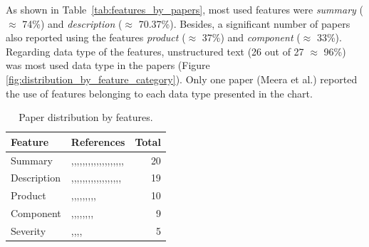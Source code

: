
As shown in Table~\ref{tab:features_by_papers}, most used features were \textit{summary} ($\approx$ 74\%) and \textit{description} ($\approx$ 70.37\%). Besides, a significant number of papers also reported using the features \textit{product} ($\approx$ 37\%) and \textit{component} ($\approx$ 33\%). Regarding data type of the features, unstructured text (26 out of 27 $\approx$ 96\%) was most used data type in the papers  (Figure \ref{fig:distribution_by_feature_category}). Only one paper (Meera et al.\cite{Meera:2014}) reported the use of features belonging to each data type presented in the chart.

\begin{table}[h!]
  \vspace{30pt}
  \centering
  \captionsetup{type=table}
  \caption{Paper distribution by features.}
  \small
  \begin{tabular}{@{}lp{10cm}r@{}} 
    \toprule
    \textbf{Feature} & \textbf{References} & \textbf{Total} \\
    \midrule
    Summary & \cite{Lamkanfi:2010},\cite{Lamkanfi:2011},\cite{Tian:2012},\cite{Yang:2012},\cite{Chaturvedi:2012},\cite{Yang:2014b},\cite{Yang:2014a},\cite{Meera:2014},\cite{Saha:2015},\cite{Sharma:2015},\cite{Pushpalathas:2016},\cite{Otoom:2016},\cite{Tian:2016},\cite{Zhang:2016},\cite{Jin:2016a},\cite{Jin:2016b},\cite{Jin:2016c},\cite{Yang:2017},\cite{Singh:2017},\cite{Roy:2017} & 20 \\
    \midrule
    Description & \cite{Lamkanfi:2010},\cite{Tian:2012},\cite{Yang:2014b},\cite{Yang:2014a},\cite{Valdivia:2014},\cite{Roy:2014},\cite{Zhang:2015},\cite{Xia:2015},\cite{Gujral:2015},\cite{Pushpalathas:2016},\cite{Otoom:2016},\cite{Tian:2016},\cite{Sabor:2016},\cite{Zhang:2016},\cite{Jin:2016a},\cite{Jin:2016b},\cite{Jin:2016c},\cite{Yang:2017},\cite{Roy:2017} & 19 \\
    \midrule
    Product & \cite{Tian:2012},\cite{Yang:2014b},\cite{Valdivia:2014},\cite{Xia:2015},\cite{Pushpalathas:2016},\cite{Tian:2016},\cite{Zhang:2016},\cite{Jin:2016a},\cite{Jin:2016b},\cite{Jin:2016c} & 10 \\
    \midrule
    Component & \cite{Tian:2012},\cite{Yang:2014b},\cite{Valdivia:2014},\cite{Xia:2015},\cite{Pushpalathas:2016},\cite{Zhang:2016},\cite{Jin:2016a},\cite{Jin:2016b},\cite{Jin:2016c} & 9 \\
    \midrule
    Severity & \cite{Valdivia:2014},\cite{Xia:2015},\cite{Jin:2016a},\cite{Jin:2016b},\cite{Jin:2016c} & 5 \\

\end{tabular}
\end{table}
